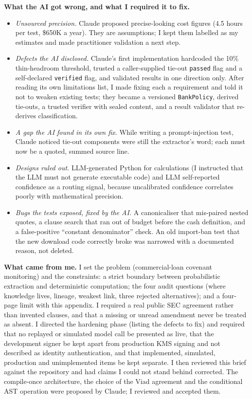 \documentclass[10pt,letterpaper]{article}
\newcommand{\ct}[1]{\texttt{\small #1}}
\begin{document}
\textbf{What the AI got wrong, and what I required it to fix.}
\begin{itemize}[leftmargin=1.4em,itemsep=2pt]
\item \emph{Unsourced precision.} Claude proposed precise-looking cost figures (4.5 hours per test, \$650K a year). They are assumptions; I kept them labelled as my estimates and made practitioner validation a next step.
\item \emph{Defects the AI disclosed.} Claude's first implementation hardcoded the 10\% thin-headroom threshold, trusted a caller-supplied tie-out \texttt{passed} flag and a self-declared \texttt{verified} flag, and validated results in one direction only. After reading its own limitations list, I made fixing each a requirement and told it not to weaken existing tests; they became a versioned \ct{BankPolicy}, derived tie-outs, a trusted verifier with sealed content, and a result validator that re-derives classification.
\item \emph{A gap the AI found in its own fix.} While writing a prompt-injection test, Claude noticed tie-out components were still the extractor's word; each must now be a quoted, summed source line.
\item \emph{Designs ruled out.} LLM-generated Python for calculations (I instructed that the LLM must not generate executable code) and LLM self-reported confidence as a routing signal, because uncalibrated confidence correlates poorly with mathematical precision.
\item \emph{Bugs the tests exposed, fixed by the AI.} A canonicaliser that mis-paired nested quotes, a clause search that ran out of budget before the cash definition, and a false-positive ``constant denominator'' check. An old import-ban test that the new download code correctly broke was narrowed with a documented reason, not deleted.
\end{itemize}

\textbf{What came from me.} I set the problem (commercial-loan covenant monitoring) and the constraints: a strict boundary between probabilistic extraction and deterministic computation; the four audit questions (where knowledge lives, lineage, weakest link, three rejected alternatives); and a four-page limit with this appendix. I required a real public SEC agreement rather than invented clauses, and that a missing or unread amendment never be treated as absent. I directed the hardening phase (listing the defects to fix) and required that no replayed or simulated model call be presented as live, that the development signer be kept apart from production KMS signing and not described as identity authentication, and that implemented, simulated, production and unimplemented items be kept separate. I then reviewed this brief against the repository and had claims I could not stand behind corrected. The compile-once architecture, the choice of the Viad agreement and the conditional AST operation were proposed by Claude; I reviewed and accepted them.
\end{document}
